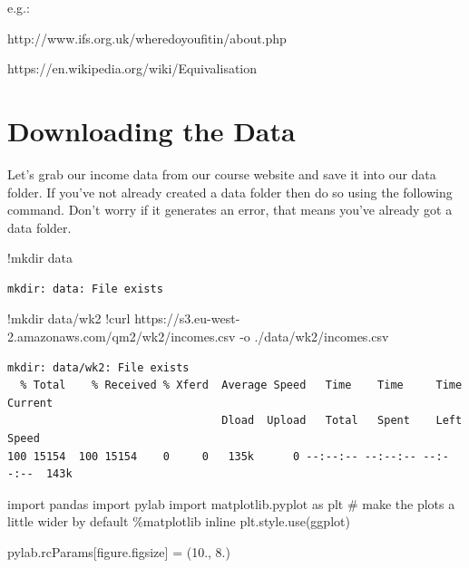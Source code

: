 \documentclass[
  letterpaper,
  DIV=11,
  numbers=noendperiod]{scrreprt}
\newenvironment{Shaded}{\begin{snugshade}}{\end{snugshade}}
\newcommand{\CommentTok}[1]{\textcolor[rgb]{0.37,0.37,0.37}{#1}}
\newcommand{\ErrorTok}[1]{\textcolor[rgb]{0.68,0.00,0.00}{#1}}
\newcommand{\FloatTok}[1]{\textcolor[rgb]{0.68,0.00,0.00}{#1}}
\newcommand{\ImportTok}[1]{\textcolor[rgb]{0.00,0.46,0.62}{#1}}
\newcommand{\NormalTok}[1]{\textcolor[rgb]{0.00,0.23,0.31}{#1}}
\newcommand{\OperatorTok}[1]{\textcolor[rgb]{0.37,0.37,0.37}{#1}}
\newcommand{\StringTok}[1]{\textcolor[rgb]{0.13,0.47,0.30}{#1}}
\begin{document}
e.g.:

http://www.ifs.org.uk/wheredoyoufitin/about.php

https://en.wikipedia.org/wiki/Equivalisation

\hypertarget{downloading-the-data}{%
\section{Downloading the Data}\label{downloading-the-data}}

Let's grab our income data from our course website and save it into our
data folder. If you've not already created a data folder then do so
using the following command. Don't worry if it generates an error, that
means you've already got a data folder.

\begin{Shaded}
\begin{Highlighting}[]
\OperatorTok{!}\NormalTok{mkdir data}
\end{Highlighting}
\end{Shaded}

\begin{verbatim}
mkdir: data: File exists
\end{verbatim}

\begin{Shaded}
\begin{Highlighting}[]
\OperatorTok{!}\NormalTok{mkdir data}\OperatorTok{/}\NormalTok{wk2}
\OperatorTok{!}\NormalTok{curl https:}\OperatorTok{//}\NormalTok{s3.eu}\OperatorTok{{-}}\NormalTok{west}\OperatorTok{{-}}\FloatTok{2.}\ErrorTok{amazonaws}\NormalTok{.com}\OperatorTok{/}\NormalTok{qm2}\OperatorTok{/}\NormalTok{wk2}\OperatorTok{/}\NormalTok{incomes.csv }\OperatorTok{{-}}\NormalTok{o .}\OperatorTok{/}\NormalTok{data}\OperatorTok{/}\NormalTok{wk2}\OperatorTok{/}\NormalTok{incomes.csv}
\end{Highlighting}
\end{Shaded}

\begin{verbatim}
mkdir: data/wk2: File exists
  % Total    % Received % Xferd  Average Speed   Time    Time     Time  Current
                                 Dload  Upload   Total   Spent    Left  Speed
100 15154  100 15154    0     0   135k      0 --:--:-- --:--:-- --:--:--  143k
\end{verbatim}

\begin{Shaded}
\begin{Highlighting}[]
\ImportTok{import}\NormalTok{ pandas}
\ImportTok{import}\NormalTok{ pylab}
\ImportTok{import}\NormalTok{ matplotlib.pyplot }\ImportTok{as}\NormalTok{ plt}
\CommentTok{\# make the plots a little wider by default}
\OperatorTok{\%}\NormalTok{matplotlib inline}
\NormalTok{plt.style.use(}\StringTok{\textquotesingle{}ggplot\textquotesingle{}}\NormalTok{)}

\NormalTok{pylab.rcParams[}\StringTok{\textquotesingle{}figure.figsize\textquotesingle{}}\NormalTok{] }\OperatorTok{=}\NormalTok{ (}\FloatTok{10.}\NormalTok{, }\FloatTok{8.}\NormalTok{)}
\end{Highlighting}
\end{Shaded}
\end{document}
